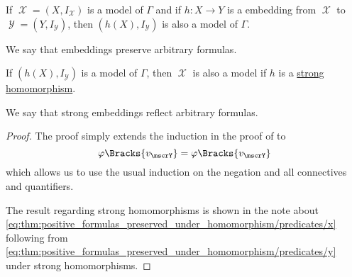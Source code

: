 \begin{proposition}\label{thm:arbitrary_formulas_preserved_under_isomorphisms}
  If \( \mscrX = (X, I_\mscrX) \) is a model of \( \Gamma \) and if \( h: X \to Y \) is a embedding from \( \mscrX \) to \( \mscrY = (Y, I_\mscrY) \), then \( (h(X), I_\mscrY) \) is also a model of \( \Gamma \).

  We say that embeddings preserve arbitrary formulas.

  If \( (h(X), I_\mscrY) \) is a model of \( \Gamma \), then \( \mscrX \) is also a model if \( h \) is a \hyperref[rem:first_order_strong_homomorphism]{strong homomorphism}.

  We say that strong embeddings reflect arbitrary formulas.
\end{proposition}
\begin{proof}
  The proof simply extends the induction in the proof of  to
  \begin{equation*}
    \varphi\Bracks{v_\mscrY} = \varphi\Bracks{v_\mscrY}
  \end{equation*}
  which allows us to use the usual induction on the negation and all connectives and quantifiers.

  The result regarding strong homomorphisms is shown in the note about \eqref{eq:thm:positive_formulas_preserved_under_homomorphism/predicates/x} following from \eqref{eq:thm:positive_formulas_preserved_under_homomorphism/predicates/y} under strong homomorphisms.
\end{proof}

